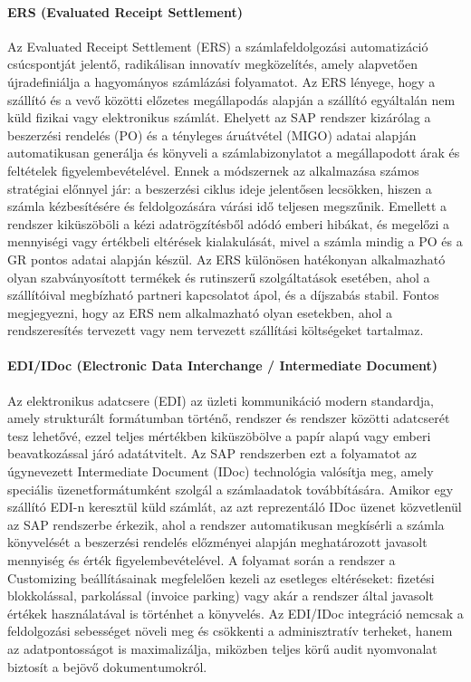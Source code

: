\paragraph{ERS (Evaluated Receipt Settlement) \cite{SAP-ERS}}
Az Evaluated Receipt Settlement (ERS) a számlafeldolgozási automatizáció csúcspontját jelentő, radikálisan innovatív megközelítés, amely alapvetően újradefiniálja a hagyományos számlázási folyamatot.
Az ERS lényege, hogy a szállító és a vevő közötti előzetes megállapodás alapján a szállító egyáltalán nem küld fizikai vagy elektronikus számlát.
Ehelyett az SAP rendszer kizárólag a beszerzési rendelés (PO) és a tényleges áruátvétel (MIGO) adatai alapján automatikusan generálja és könyveli a számlabizonylatot a megállapodott árak és feltételek figyelembevételével.
Ennek a módszernek az alkalmazása számos stratégiai előnnyel jár: a beszerzési ciklus ideje jelentősen lecsökken, hiszen a számla kézbesítésére és feldolgozására várási idő teljesen megszűnik.
Emellett a rendszer kiküszöböli a kézi adatrögzítésből adódó emberi hibákat, és megelőzi a mennyiségi vagy értékbeli eltérések kialakulását, mivel a számla mindig a PO és a GR pontos adatai alapján készül.
Az ERS különösen hatékonyan alkalmazható olyan szabványosított termékek és rutinszerű szolgáltatások esetében, ahol a szállítóival megbízható partneri kapcsolatot ápol, és a díjszabás stabil.
Fontos megjegyezni, hogy az ERS nem alkalmazható olyan esetekben, ahol a rendszeresítés tervezett vagy nem tervezett szállítási költségeket tartalmaz.

\paragraph{EDI/IDoc (Electronic Data Interchange / Intermediate Document) \cite{SAP-EDI}}
Az elektronikus adatcsere (EDI) az üzleti kommunikáció modern standardja, amely strukturált formátumban történő, rendszer és rendszer közötti adatcserét tesz lehetővé, ezzel teljes mértékben kiküszöbölve a papír alapú vagy emberi beavatkozással járó adatátvitelt.
Az SAP rendszerben ezt a folyamatot az úgynevezett Intermediate Document (IDoc) technológia valósítja meg, amely speciális üzenetformátumként szolgál a számlaadatok továbbítására.
Amikor egy szállító EDI-n keresztül küld számlát, az azt reprezentáló IDoc üzenet közvetlenül az SAP rendszerbe érkezik, ahol a rendszer automatikusan megkísérli a számla könyvelését a beszerzési rendelés előzményei alapján meghatározott javasolt mennyiség és érték figyelembevételével.
A folyamat során a rendszer a Customizing beállításainak megfelelően kezeli az esetleges eltéréseket: fizetési blokkolással, parkolással (invoice parking) vagy akár a rendszer által javasolt értékek használatával is történhet a könyvelés.
Az EDI/IDoc integráció nemcsak a feldolgozási sebességet növeli meg és csökkenti a adminisztratív terheket, hanem az adatpontosságot is maximalizálja, miközben teljes körű audit nyomvonalat biztosít a bejövő dokumentumokról.

